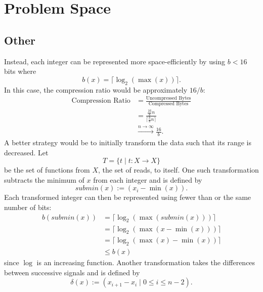 \chapter{Problem Space} \label{chap:probspace}









\section{Other}

Instead, each integer can be represented more space-efficiently by using $b<16$ bits where \[b(x)=\lceil\log_2(\max(x))\rceil.\] In this case, the compression ratio would be approximately $16/b$:
\begin{align*}
	\text{Compression Ratio} &= \frac{\text{Uncompressed Bytes}}{\text{Compressed Bytes}}\\
	&=\frac{\frac{16}{8}n}{\lceil\frac{b}{8}n\rceil}\\
	&\stackrel{n\to\infty}{\longrightarrow}\frac{16}{b}.
\end{align*}
A better strategy would be to initially transform the data such that its range is decreased.
Let \[T=\{t\mid t:X\to X\}\] be the set of functions from $X$, the set of reads, to itself. One such transformation subtracts the minimum of $x$ from each integer and is defined by \[ submin(x) := (x_i-\min(x)). \] Each transformed integer can then be represented using fewer than or the same number of bits:
\begin{align*}
	b(submin(x))&=\lceil\log_2(\max(submin(x)))\rceil\\
	&=\lceil\log_2(\max(x-\min(x)))\rceil\\
	&=\lceil\log_2(\max(x)-\min(x))\rceil\\
	&\le b(x)
\end{align*}
since $\log$ is an increasing function.
Another transformation takes the differences between successive signals and is defined by
\[ \delta(x):=(x_{i+1}-x_i\mid 0\le i\le n-2).\]

